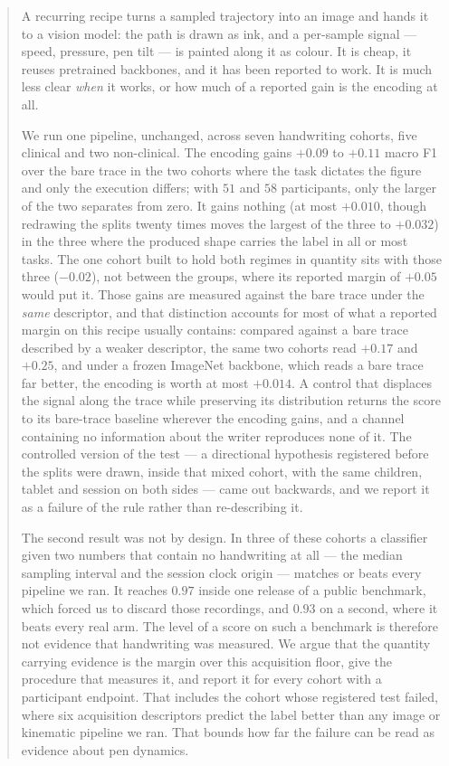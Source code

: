 \documentclass{article}
\begin{document}
\begin{abstract}
A recurring recipe turns a sampled trajectory into an image and hands it to a vision model:
the path is drawn as ink, and a per-sample signal --- speed, pressure, pen tilt --- is painted
along it as colour. It is cheap, it reuses pretrained backbones, and it has been reported to work.
It is much less clear \emph{when} it works, or how much of a reported gain is the encoding at all.

We run one pipeline, unchanged, across seven handwriting cohorts, five clinical and two
non-clinical. The encoding
gains $+0.09$ to $+0.11$ macro F1 over the bare trace in the two cohorts where the task dictates
the figure and only the execution differs; with $51$ and $58$ participants, only the larger of the
two separates from zero. It gains nothing (at most $+0.010$, though redrawing the
splits twenty times moves the largest of the three to $+0.032$) in the three
where the produced shape carries the label in all or most tasks. The one cohort built to hold
both regimes in quantity sits with those three ($-0.02$), not between the groups, where its
reported margin of $+0.05$ would put it. Those gains are measured against the bare trace
under the \emph{same} descriptor, and that distinction accounts for most of what a reported margin
on this recipe usually contains: compared against a bare trace described by a weaker descriptor,
the same two cohorts read $+0.17$ and $+0.25$, and under a frozen ImageNet backbone, which reads
a bare trace far better, the encoding is worth at most $+0.014$. A control that displaces the
signal along the trace while preserving its distribution returns the score to its bare-trace
baseline wherever the encoding gains, and a channel containing no information about the writer
reproduces none of it. The controlled version of the test --- a directional hypothesis registered
before the splits were drawn, inside that mixed cohort, with the same children, tablet and session
on both sides --- came out backwards, and we report it as a failure of the rule rather than
re-describing it.

The second result was not by design. In three of these cohorts a classifier given two numbers that
contain no handwriting at all --- the median sampling interval and the session clock origin ---
matches or beats every pipeline we ran. It reaches $0.97$ inside one release of a public
benchmark, which forced us to discard those recordings, and $0.93$ on a second, where it beats
every real arm. The level of a score on such a benchmark is therefore not evidence that handwriting
was measured. We argue that the quantity carrying evidence is the margin over this acquisition
floor, give the procedure that measures it, and report it for every cohort with a participant
endpoint. That includes the cohort whose registered test failed, where six acquisition
descriptors predict the label better than any image or kinematic pipeline we ran. That bounds how
far the failure can be read as evidence about pen dynamics.
\end{abstract}
\end{document}
